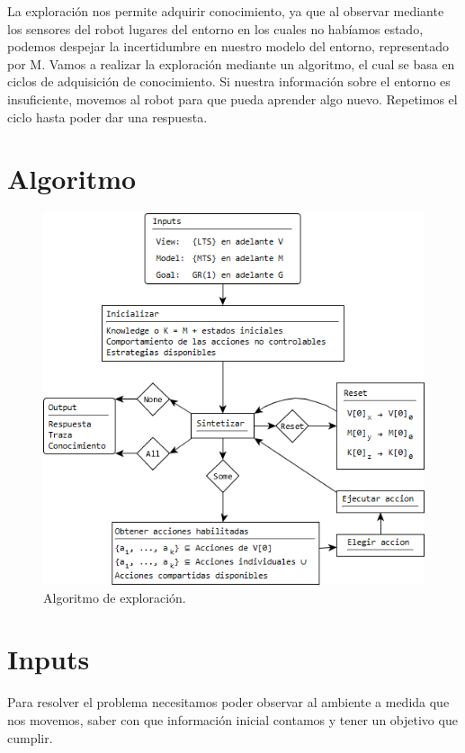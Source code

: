 \vspace{\baselineskip}
La exploración nos permite adquirir conocimiento, ya que al observar mediante los sensores del robot lugares del entorno en los cuales
no habíamos estado, podemos despejar la incertidumbre en nuestro modelo del entorno, representado por M. Vamos a realizar la exploración
mediante un algoritmo, el cual se basa en ciclos de adquisición de conocimiento. Si nuestra información sobre el entorno es insuficiente,
movemos al robot para que pueda aprender algo nuevo. Repetimos el ciclo hasta poder dar una respuesta.

\section{Algoritmo}

\begin{figure}[H]
  \centering
    \includegraphics{Imagenes/Algoritmo/Algoritmo.png}
  \caption{Algoritmo de exploración.}
  \label{fig:Algoritmo}
\end{figure}

\section{Inputs}

Para resolver el problema necesitamos poder observar al ambiente a medida que nos movemos, saber con que información inicial 
contamos y tener un objetivo que cumplir.

